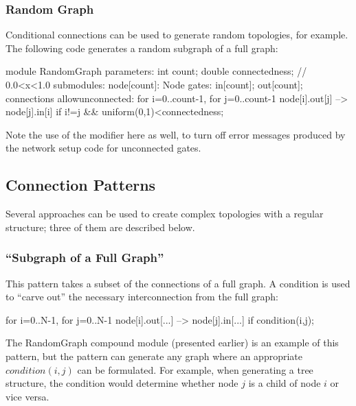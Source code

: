 \subsubsection{Random Graph}
\label{sec:ned-lang:random-graph-example}

Conditional connections can be used to generate random
topologies, for example. The following code
generates a random subgraph of a full graph:

\begin{ned}
module RandomGraph {
    parameters:
        int count;
        double connectedness; // 0.0<x<1.0
    submodules:
        node[count]: Node {
            gates:
                in[count];
                out[count];
        }
    connections allowunconnected:
        for i=0..count-1, for j=0..count-1 {
            node[i].out[j] --> node[j].in[i]
                if i!=j && uniform(0,1)<connectedness;
        }
}
\end{ned}

Note the use of the  modifier
here as well, to turn off error messages produced by the network setup code
for unconnected gates.


\subsection{Connection Patterns}
\label{sec:ned-lang:connection-design-patterns}


Several approaches can be used to create complex topologies with a
regular structure; three of them are described below.


\subsubsection{``Subgraph of a Full Graph''}
\label{sec:ned-lang:subgraph-of-full-graph}


This pattern takes a subset of the connections of a full graph.  A
condition is used to ``carve out'' the necessary interconnection from
the full graph:

\begin{ned}
for i=0..N-1, for j=0..N-1 {
    node[i].out[...] --> node[j].in[...] if condition(i,j);
}
\end{ned}

The RandomGraph compound module (presented earlier) is an example of
this pattern, but the pattern can generate any graph where an
appropriate $condition(i,j)$ can be formulated. For example,
when generating a tree structure, the condition
would determine whether node $j$ is a child of node $i$ or
vice versa.

